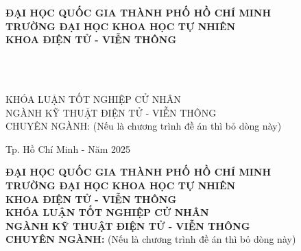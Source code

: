 \hypersetup{pageanchor=false}
\begin{titlepage}

\begin{center}
\textbf{ĐẠI HỌC QUỐC GIA THÀNH PHỐ HỒ CHÍ MINH\\
TRƯỜNG ĐẠI HỌC KHOA HỌC TỰ NHIÊN\\
KHOA ĐIỆN TỬ - VIỄN THÔNG}\\[2cm]


{ \Large \bfseries \tenSV \\[2cm] } 


{ \Large \bfseries \tenKL \\[5cm]} 


\large KHÓA LUẬN TỐT NGHIỆP CỬ NHÂN\\
\large NGÀNH KỸ THUẬT ĐIỆN TỬ - VIỄN THÔNG\\
\large CHUYÊN NGÀNH: \tenBM (Nếu là chương trình đề án thì bỏ dòng này)



\vfill
Tp. Hồ Chí Minh - Năm 2025

\end{center}

\pagebreak

\myemptypage

\begin{center}
\textbf{ĐẠI HỌC QUỐC GIA THÀNH PHỐ HỒ CHÍ MINH\\
TRƯỜNG ĐẠI HỌC KHOA HỌC TỰ NHIÊN\\
KHOA ĐIỆN TỬ - VIỄN THÔNG}\\[2cm]

\large \textbf{KHÓA LUẬN TỐT NGHIỆP CỬ NHÂN}\\
\large \textbf{NGÀNH KỸ THUẬT ĐIỆN TỬ - VIỄN THÔNG}\\%
\large \textbf{CHUYÊN NGÀNH: \tenBM} (Nếu là chương trình đề án thì bỏ dòng này)\\[2cm]



\end{center}
\end{titlepage}
